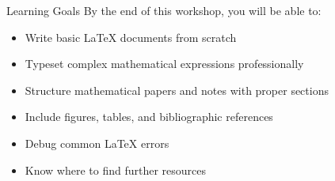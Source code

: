 \documentclass[ 9pt]{beamer}
\begin{document}
    \begin{frame}{Learning Goals}
        By the end of this workshop, you will be able to:
        \begin{itemize}
            \item Write basic LaTeX documents from scratch
            \item Typeset complex mathematical expressions professionally
            \item Structure mathematical papers and notes with proper sections
            \item Include figures, tables, and bibliographic references
            \item Debug common LaTeX errors
            \item Know where to find further resources
        \end{itemize}
    \end{frame}
    
\end{document}
